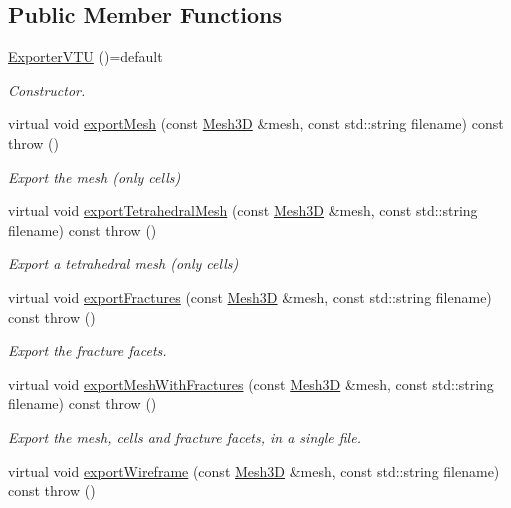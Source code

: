 \subsection*{Public Member Functions}
\begin{DoxyCompactItemize}
\item 
\hyperlink{classFVCode3D_1_1ExporterVTU_a0e467b067b3cff3c1b563dda84794818}{Exporter\+V\+TU} ()=default
\begin{DoxyCompactList}\small\item\em Constructor. \end{DoxyCompactList}\item 
virtual void \hyperlink{classFVCode3D_1_1ExporterVTU_a8e5eff8e388cf6de1bf1c1deca863ac7}{export\+Mesh} (const \hyperlink{classFVCode3D_1_1Mesh3D}{Mesh3D} \&mesh, const std\+::string filename) const   throw ()
\begin{DoxyCompactList}\small\item\em Export the mesh (only cells) \end{DoxyCompactList}\item 
virtual void \hyperlink{classFVCode3D_1_1ExporterVTU_ac043bd93a6a079f864bc1b76a21df6a2}{export\+Tetrahedral\+Mesh} (const \hyperlink{classFVCode3D_1_1Mesh3D}{Mesh3D} \&mesh, const std\+::string filename) const   throw ()
\begin{DoxyCompactList}\small\item\em Export a tetrahedral mesh (only cells) \end{DoxyCompactList}\item 
virtual void \hyperlink{classFVCode3D_1_1ExporterVTU_abdb2e3f36907610720d698d9bfa9428d}{export\+Fractures} (const \hyperlink{classFVCode3D_1_1Mesh3D}{Mesh3D} \&mesh, const std\+::string filename) const   throw ()
\begin{DoxyCompactList}\small\item\em Export the fracture facets. \end{DoxyCompactList}\item 
virtual void \hyperlink{classFVCode3D_1_1ExporterVTU_a5af587a4d971f4d41caecbef3477211b}{export\+Mesh\+With\+Fractures} (const \hyperlink{classFVCode3D_1_1Mesh3D}{Mesh3D} \&mesh, const std\+::string filename) const   throw ()
\begin{DoxyCompactList}\small\item\em Export the mesh, cells and fracture facets, in a single file. \end{DoxyCompactList}\item 
virtual void \hyperlink{classFVCode3D_1_1ExporterVTU_a672c00cd380554714d09d5d9b0b56a24}{export\+Wireframe} (const \hyperlink{classFVCode3D_1_1Mesh3D}{Mesh3D} \&mesh, const std\+::string filename) const   throw ()

\end{DoxyCompactItemize}
